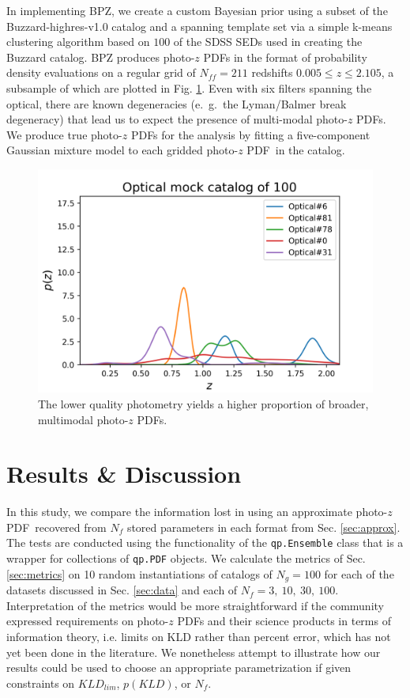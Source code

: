 \documentclass[\docopts]{\docclass}
\newcommand{\pz}{photo-$z$ PDF}
\begin{document}
In implementing BPZ, we create a custom Bayesian prior using a subset of the 
Buzzard-highres-v1.0 catalog and a spanning template set via a simple k-means 
clustering algorithm based on $100$ of the SDSS SEDs used in creating the 
Buzzard catalog.  BPZ produces \pz s in the format of probability density 
evaluations on a regular grid of $N_{ff}=211$ redshifts $0.005\leq z\leq2.105$, 
a subsample of which are plotted in Fig. \ref{fig:lsst_pzs}.  Even with six 
filters spanning the optical, there are known degeneracies (e.~g.~the 
Lyman/Balmer break degeneracy) that lead us to expect the presence of 
multi-modal \pz s.  We produce true \pz s for the analysis by fitting a 
five-component Gaussian mixture model to each gridded \pz\ in the catalog.

\begin{figure}
  \includegraphics[width=0.9\columnwidth]{figures/lsst_pzs.png}
  \caption{The lower quality photometry yields a higher proportion of broader, 
multimodal \pz s.
  \label{fig:lsst_pzs}}
\end{figure}


\section{Results \& Discussion}
\label{sec:results}


In this study, we compare the information lost in using an approximate \pz\ 
recovered from $N_{f}$ stored parameters in each format from Sec. 
\ref{sec:approx}.  The tests are conducted using the functionality of the 
\texttt{qp.Ensemble} class that is a wrapper for collections of \texttt{qp.PDF} 
objects.  We calculate the metrics of Sec. \ref{sec:metrics} on 10 random 
instantiations of catalogs of $N_{g}=100$ for each of the datasets discussed in 
Sec. \ref{sec:data} and each of $N_{f}=3,\ 10,\ 30,\ 100$.  Interpretation of 
the metrics would be more straightforward if the community expressed 
requirements on \pz s and their science products in terms of information 
theory, i.e. limits on KLD rather than percent error, which has not yet been 
done in the literature.  We nonetheless attempt to illustrate how our results 
could be used to choose an appropriate parametrization if given constraints on 
$KLD_{lim}$, $p(KLD)$, or $N_{f}$.
\end{document}
